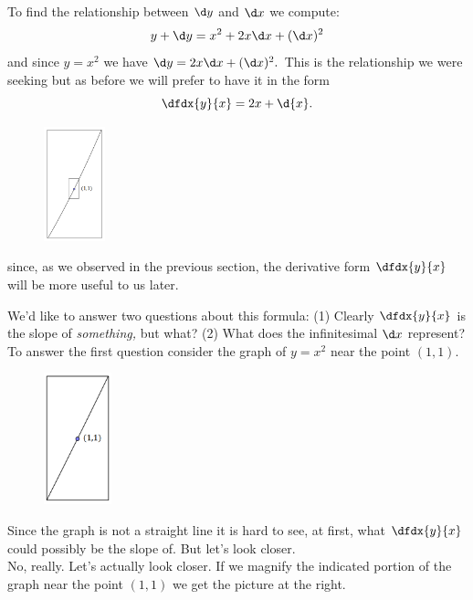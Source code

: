 To find the relationship between $\d y$ and $\d x$ we compute:
\begin{equation}
y+\d y = x^2+2x\d x +(\d x)^2
\label{eq:SquareDifferential1}
\end{equation}
and since $y=x^2$ we have $\d y =2x\d x +(\d x)^2.$
This is the relationship we were seeking but as before we will prefer
to have it in the form
\begin{equation}
\dfdx{y}{x} = 2x+\d{x}.
\label{eq:SquareDifferential2}
\end{equation}
\begin{figure}
\captionsetup{labelformat=empty}
\centerline{\includegraphics*[height=1.3in,width=.75in]{Figures/SquareFunctionMag1}}
\label{fig:SquareFunctionMag1}
\end{figure}
since, as we observed in the previous section, the derivative form
$\dfdx{y}{x}$ will be more useful to us later.

We'd like to answer two questions about this formula: (1) Clearly
$\dfdx{y}{x}$ is the slope of \emph{something,} but what? (2) What
does the infinitesimal $\d x$ represent?
To answer the first question consider the graph of $y=x^2$ near the
point $(1,1).$

\begin{figure}
\captionsetup{labelformat=empty}
\centerline{\includegraphics*[height=1.5in,width=.75in]{Figures/SquareFunctionMag2}}
\label{fig:SquareFunctionMag2}
\end{figure}
Since the graph is not a straight line it is hard to see, at first,
what $\dfdx{y}{x}$ could possibly be the slope of. But let's look
closer.\\
No, really. Let's actually look closer. If we magnify the indicated portion of the graph near the point
$(1,1)$ we get the picture at the right.


